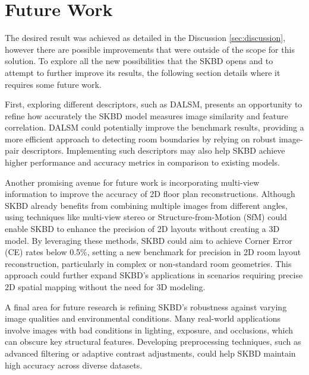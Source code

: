\section{Future Work}
\label{sec:futurework}
The desired result was achieved as detailed in the Discussion \ref{sec:discussion}, however there are possible improvements that were outside of the scope for this solution.
To explore all the new possibilities that the SKBD opens and to attempt to further improve its results, the following section details where it requires some future work.

 First, exploring different descriptors, such as DALSM, presents an opportunity to refine how accurately the SKBD model measures image similarity and feature correlation. DALSM could potentially improve the benchmark results, providing a more efficient approach to detecting room boundaries by relying on robust image-pair descriptors. Implementing such descriptors may also help SKBD achieve higher performance and accuracy metrics in comparison to existing models.

Another promising avenue for future work is incorporating multi-view information to improve the accuracy of 2D floor plan reconstructions. Although SKBD already benefits from combining multiple images from different angles, using techniques like multi-view stereo or Structure-from-Motion (SfM) could enable SKBD to enhance the precision of 2D layouts without creating a 3D model. By leveraging these methods, SKBD could aim to achieve Corner Error (CE) rates below 0.5\%, setting a new benchmark for precision in 2D room layout reconstruction, particularly in complex or non-standard room geometries. This approach could further expand SKBD’s applications in scenarios requiring precise 2D spatial mapping without the need for 3D modeling.

A final area for future research is refining SKBD’s robustness against varying image qualities and environmental conditions. Many real-world applications involve images with bad conditions in lighting, exposure, and occlusions, which can obscure key structural features. Developing preprocessing techniques, such as advanced filtering or adaptive contrast adjustments, could help SKBD maintain high accuracy across diverse datasets.
